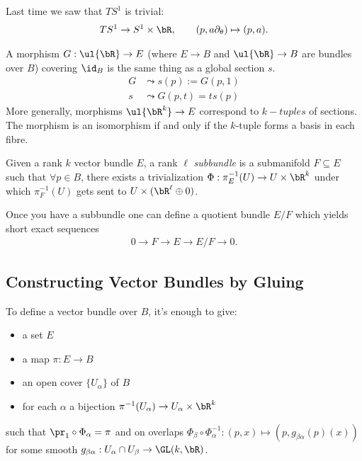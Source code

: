 \begin{example}\label{example:lec2.14}
	Last time we saw that $TS^1$ is trivial:
	\begin{align*}
		TS^1 \to S^1\times \bR, \hspace{2em} (p,a\partial_\theta) \mapsto (p,a).
	\end{align*}
\end{example}
\begin{example}\label{example:lec2.15}
	A morphism $G:\ul{\bR}\to E$ (where $E\to B$ and $\ul{\bR}\to B$ are bundles over $B$) covering $\id_B$ is the same thing as a global section $s$.
    \begin{align*}
		G &\leadsto s(p) := G(p,1) \\
		s &\leadsto G(p,t) = ts(p)
    \end{align*}
	More generally, morphisms $\ul{\bR^k}\to E$ correspond to $k-tuples$ of sections. The morphism is an isomorphism if and only if the $k$-tuple forms a basis in each fibre.
\end{example}
\begin{defn}\label{defn:subbundle}
	Given a rank $k$ vector bundle $E$, a rank $\ell$ \emph{subbundle} is a submanifold $F \subseteq E$ such that $\forall p \in B$, there exists a trivialization $\Phi:\pi^{-1}_E(U) \to U\times \bR^k$ under which $\pi^{-1}_F(U)$ gets sent to $U\times (\bR^\ell \oplus 0)$.
\end{defn}
Once you have a subbundle one can define a quotient bundle $E/F$ which yields short exact sequences
\begin{align*}
	0 \to F\to E\to E/F \to 0.
\end{align*}

\subsection{Constructing Vector Bundles by Gluing}
To define a vector bundle over $B$, it's enough to give:
\begin{itemize}
	\item a set $E$
	\item a map $\pi :E\to B$
	\item an open cover $\{U_\alpha\}$ of $B$
	\item for each $\alpha$ a bijection $\pi^{-1}(U_\alpha) \to U_\alpha \times \bR^k$
\end{itemize}
such that $\pr_1\circ \Phi_\alpha = \pi$ and on overlaps $\Phi_\beta\circ \Phi_\alpha^{-1}:(p,x) \mapsto (p,g_{\beta\alpha}(p)(x))$ for some smooth $g_{\beta\alpha}:U_\alpha\cap U_\beta \to \GL(k,\bR)$.

